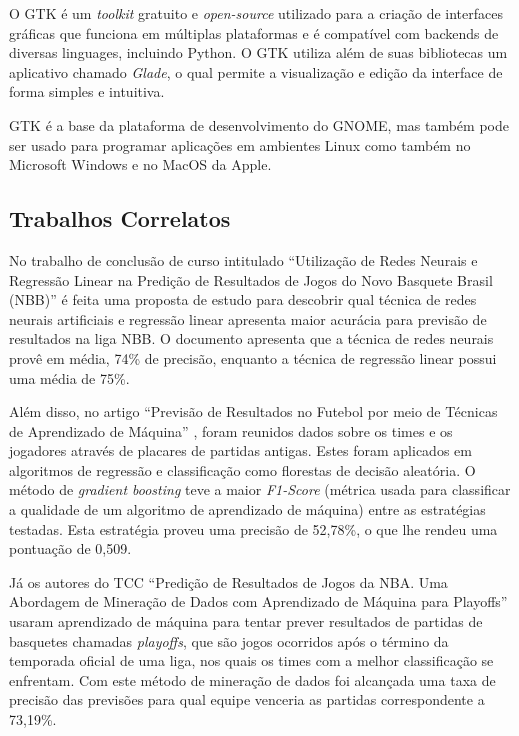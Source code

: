 \documentclass[brazilian]{ifsc-tcc}
\begin{document}
O GTK é um \textit{toolkit} gratuito e \textit{open-source} utilizado para a criação de interfaces gráficas que funciona em múltiplas plataformas e é compatível com backends de diversas linguages, incluindo Python. O GTK utiliza além de suas bibliotecas um aplicativo chamado \textit{Glade}, o qual permite a visualização e edição da interface de forma simples e intuitiva.

GTK é a base da plataforma de desenvolvimento do GNOME, mas também pode ser usado para programar aplicações em ambientes Linux como também no Microsoft Windows e no MacOS da Apple.

\subsection{Trabalhos Correlatos}
No trabalho de conclusão de curso intitulado “Utilização de Redes Neurais e Regressão Linear na Predição de Resultados de Jogos do Novo Basquete Brasil (NBB)” \cite{tcc-nbb-neural-linear} é feita uma proposta de estudo para descobrir qual técnica de redes neurais artificiais e regressão linear apresenta maior acurácia para previsão de resultados na liga NBB. O documento apresenta que a técnica de redes neurais provê em média, 74\% de precisão, enquanto a técnica de regressão linear possui uma média de 75\%.

Além disso, no artigo “Previsão de Resultados no Futebol por meio de Técnicas de Aprendizado de Máquina” \cite{tcc-previsao-futebol}, foram reunidos dados sobre os times e os jogadores através de placares de partidas antigas. Estes foram aplicados em algoritmos de regressão e classificação como florestas de decisão aleatória. O método de \textit{gradient boosting} teve a maior \textit{F1-Score} (métrica usada para classificar a qualidade de um algoritmo de aprendizado de máquina) entre as estratégias testadas. Esta estratégia proveu uma precisão de 52,78\%, o que lhe rendeu uma pontuação de 0,509.

Já os autores do TCC “Predição de Resultados de Jogos da NBA. Uma Abordagem de Mineração de Dados com Aprendizado de Máquina para Playoffs” \cite{Predicao-de-playoff-com-mineracao-de-dados} usaram aprendizado de máquina para tentar prever resultados de partidas de basquetes chamadas \textit{playoffs}, que são jogos ocorridos após o término da temporada oficial de uma liga, nos quais os times com a melhor classificação se enfrentam. Com este método de mineração de dados foi alcançada uma taxa de precisão das previsões para qual equipe venceria as partidas correspondente a 73,19\%.
\end{document}
